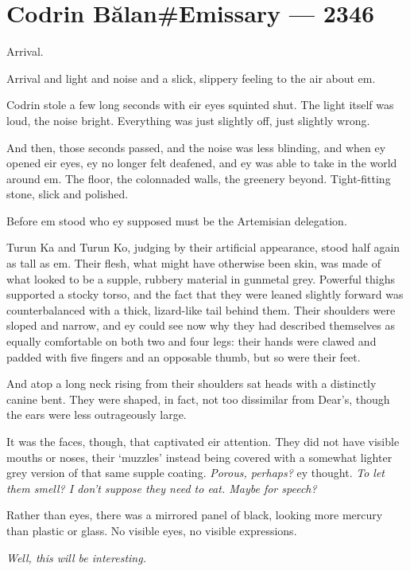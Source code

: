 \hypertarget{codrin-bux103lanemissary-2346}{%
\chapter{Codrin Bălan\#Emissary — 2346}\label{codrin-bux103lanemissary-2346}}

Arrival.

Arrival and light and noise and a slick, slippery feeling to the air about em.

Codrin stole a few long seconds with eir eyes squinted shut. The light itself was loud, the noise bright. Everything was just slightly off, just slightly wrong.

And then, those seconds passed, and the noise was less blinding, and when ey opened eir eyes, ey no longer felt deafened, and ey was able to take in the world around em. The floor, the colonnaded walls, the greenery beyond. Tight-fitting stone, slick and polished.

Before em stood who ey supposed must be the Artemisian delegation.

Turun Ka and Turun Ko, judging by their artificial appearance, stood half again as tall as em. Their flesh, what might have otherwise been skin, was made of what looked to be a supple, rubbery material in gunmetal grey. Powerful thighs supported a stocky torso, and the fact that they were leaned slightly forward was counterbalanced with a thick, lizard-like tail behind them. Their shoulders were sloped and narrow, and ey could see now why they had described themselves as equally comfortable on both two and four legs: their hands were clawed and padded with five fingers and an opposable thumb, but so were their feet.

And atop a long neck rising from their shoulders sat heads with a distinctly canine bent. They were shaped, in fact, not too dissimilar from Dear's, though the ears were less outrageously large.

It was the faces, though, that captivated eir attention. They did not have visible mouths or noses, their `muzzles' instead being covered with a somewhat lighter grey version of that same supple coating. \emph{Porous, perhaps?} ey thought. \emph{To let them smell? I don't suppose they need to eat. Maybe for speech?}

Rather than eyes, there was a mirrored panel of black, looking more mercury than plastic or glass. No visible eyes, no visible expressions.

\emph{Well, this will be interesting.}

